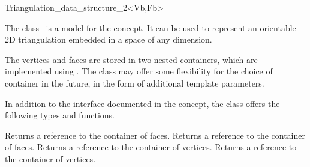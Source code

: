 

\begin{ccRefClass}{Triangulation_data_structure_2<Vb,Fb>}  %

\ccDefinition
  
The class \ccRefName\ is a  model
for the  concept.
It can be used to represent an orientable 2D triangulation
embedded in a space of any dimension.

The vertices and faces are stored in two nested containers, which are
implemented using .  The class may offer some
flexibility for the choice of container in the future, in the form of
additional template parameters.


\ccIsModel
{}

\begin{ccAdvanced}


In addition to the interface documented in the concept, the class offers the
following types and functions.

\ccTypes

\ccGlue
{}

\ccOperations

{Returns a reference to the container of faces.}
\ccGlue
{}
{Returns a reference to the container of faces.}
\ccGlue
{}
{Returns a reference to the container of vertices.}
\ccGlue
{}
{Returns a reference to the container of vertices.}


\end{ccAdvanced}
\end{ccRefClass}

